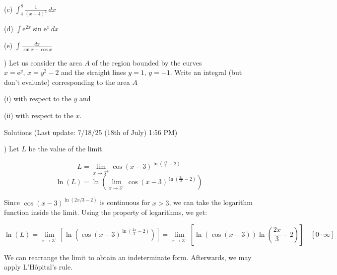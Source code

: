 \documentclass{article}
\begin{document}
\hfill

\noindent (c) $\displaystyle \int_4^8 \frac{1}{(x-4)^3}\, dx$

\hfill

\noindent (d) $\displaystyle \int\mathrm{e}^{2x}\sin \mathrm{e}^x\,dx$

\hfill

\noindent (e) $\displaystyle \int\frac{dx}{\sin x - \cos x}$

\hfill

) Let us consider the area $A$ of the region bounded by the curves $x=\mathrm{e}^y, \, x=y^2-2$ and the straight lines $y=1, \, y=-1$. Write an integral (but don't evaluate) corresponding to the area $A$

\hfill

\noindent (i) with respect to the $y$ and

\noindent (ii) with respect to the $x$.

\newpage

\begin{center}
Solutions (Last update: 7/18/25 (18th of July) 1:56 PM)
\end{center}

) Let $L$ be the value of the limit.

\begin{equation*} L = \lim_{x\to3^+}\cos(x-3)^{\ln\left(\frac{2x}{3}-2\right)}\end{equation*}
\begin{equation*}\ln(L) =\ln\left( \lim_{x\to3^+}\cos(x-3)^{\ln\left(\frac{2x}{3}-2\right)}\right)\end{equation*}

\hfill

\noindent Since $\cos(x-3)^{\ln(2x/3 -2)}$ is continuous for $x>3$, we can take the logarithm function inside the limit. Using the property of logarithms, we get:

\begin{equation*}\ln(L) =\lim_{x\to3^+}\left[ \ln\left(\cos(x-3)^{\ln\left(\frac{2x}{3}-2\right)}\right)\right] = \lim_{x\to3^+}\left[ \ln\left(\cos(x-3)\right)\ln\left(\frac{2x}{3}-2\right)\right]\quad[0 \cdot \infty] \end{equation*}

\hfill

\noindent We can rearrange the limit to obtain an indeterminate form. Afterwards, we may apply L'Hôpital's rule.
\end{document}
